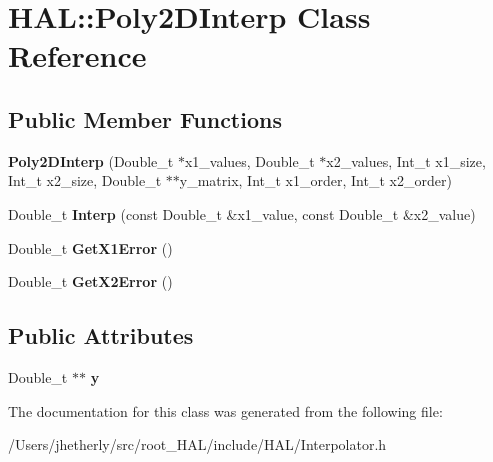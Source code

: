 \hypertarget{class_h_a_l_1_1_poly2_d_interp}{\section{H\-A\-L\-:\-:Poly2\-D\-Interp Class Reference}
\label{class_h_a_l_1_1_poly2_d_interp}
}
\subsection*{Public Member Functions}
\begin{DoxyCompactItemize}
\item 
\hypertarget{class_h_a_l_1_1_poly2_d_interp_a2e06fafe80eb98739813a67a1f5b5f89}{{\bfseries Poly2\-D\-Interp} (Double\-\_\-t $\ast$x1\-\_\-values, Double\-\_\-t $\ast$x2\-\_\-values, Int\-\_\-t x1\-\_\-size, Int\-\_\-t x2\-\_\-size, Double\-\_\-t $\ast$$\ast$y\-\_\-matrix, Int\-\_\-t x1\-\_\-order, Int\-\_\-t x2\-\_\-order)}\label{class_h_a_l_1_1_poly2_d_interp_a2e06fafe80eb98739813a67a1f5b5f89}

\item 
\hypertarget{class_h_a_l_1_1_poly2_d_interp_aaeda2c3c4e09d48611973dcd95940756}{Double\-\_\-t {\bfseries Interp} (const Double\-\_\-t \&x1\-\_\-value, const Double\-\_\-t \&x2\-\_\-value)}\label{class_h_a_l_1_1_poly2_d_interp_aaeda2c3c4e09d48611973dcd95940756}

\item 
\hypertarget{class_h_a_l_1_1_poly2_d_interp_a3488ef8691d670a5f2170a9ebead44d7}{Double\-\_\-t {\bfseries Get\-X1\-Error} ()}\label{class_h_a_l_1_1_poly2_d_interp_a3488ef8691d670a5f2170a9ebead44d7}

\item 
\hypertarget{class_h_a_l_1_1_poly2_d_interp_a9d7ab5e66ee29fe41187d39086152dfe}{Double\-\_\-t {\bfseries Get\-X2\-Error} ()}\label{class_h_a_l_1_1_poly2_d_interp_a9d7ab5e66ee29fe41187d39086152dfe}

\end{DoxyCompactItemize}
\subsection*{Public Attributes}
\begin{DoxyCompactItemize}
\item 
\hypertarget{class_h_a_l_1_1_poly2_d_interp_af07844f91abbfa62348292ae16a90fdc}{Double\-\_\-t $\ast$$\ast$ {\bfseries y}}\label{class_h_a_l_1_1_poly2_d_interp_af07844f91abbfa62348292ae16a90fdc}

\end{DoxyCompactItemize}


The documentation for this class was generated from the following file\-:\begin{DoxyCompactItemize}
\item 
/\-Users/jhetherly/src/root\-\_\-\-H\-A\-L/include/\-H\-A\-L/Interpolator.\-h\end{DoxyCompactItemize}

